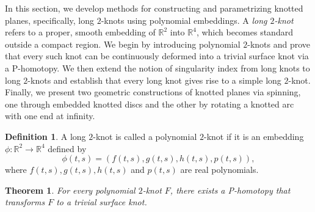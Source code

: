 \documentclass[10pt,a4paper,reqno]{amsart}
\newtheorem{theorem}{Theorem}[section]
\theoremstyle{definition}
\newtheorem{definition}{Definition}[section]
\theoremstyle{remark}
\newcommand{\R}{\mathbb R}
\begin{document}
 In this section, we develop methods for constructing and  parametrizing knotted planes, specifically, long $2$-knots using polynomial embeddings. A \emph{long $2$-knot} refers to a proper, smooth embedding of $\R^2$ into $\R^4$, which becomes standard outside a compact region. We begin by introducing polynomial $2$-knots and prove that every such knot can be continuously deformed into a trivial surface knot via a P-homotopy. We then extend the notion of singularity index from long knots to long $2$-knots and establish that every long knot gives rise to a simple long $2$-knot. Finally, we present two geometric constructions of knotted planes via spinning, one through embedded knotted discs and the other by rotating a knotted arc with one end at infinity.
 \begin{definition}
 	A long $2$-knot is called a polynomial $2$-knot if  it is an embedding $\phi : \R^{2} \rightarrow \R^{4}$ defined by
 	\[ \phi(t,s) = (f (t,s), g(t,s), h(t,s), p(t,s)),\]
 	where $f (t,s), g(t,s), h(t,s)$ and $p(t,s)$ are real polynomials.
 \end{definition}
 \begin{theorem}\label{th:homotopy}
 	For every polynomial $2$-knot $F$, there exists a  P-homotopy that transforms $F$  to a trivial surface knot.
 \end{theorem}
\end{document}
